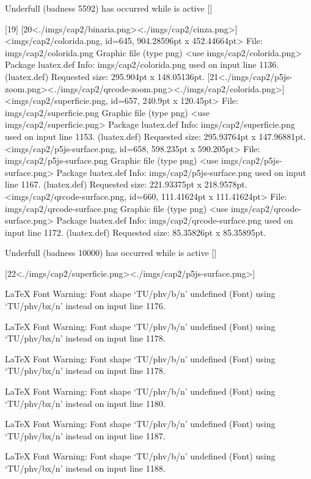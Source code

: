 Underfull \vbox (badness 5592) has occurred while \output is active []

[19] [20<./imgs/cap2/binaria.png><./imgs/cap2/cinza.png>]
<imgs/cap2/colorida.png, id=645, 904.28596pt x 452.44664pt>
File: imgs/cap2/colorida.png Graphic file (type png)
<use imgs/cap2/colorida.png>
Package luatex.def Info: imgs/cap2/colorida.png  used on input line 1136.
(luatex.def)             Requested size: 295.904pt x 148.05136pt.
[21<./imgs/cap2/p5js-zoom.png><./imgs/cap2/qrcode-zoom.png><./imgs/cap2/colorida.png>]
<imgs/cap2/superficie.png, id=657, 240.9pt x 120.45pt>
File: imgs/cap2/superficie.png Graphic file (type png)
<use imgs/cap2/superficie.png>
Package luatex.def Info: imgs/cap2/superficie.png  used on input line 1153.
(luatex.def)             Requested size: 295.93764pt x 147.96881pt.
<imgs/cap2/p5js-surface.png, id=658, 598.235pt x 590.205pt>
File: imgs/cap2/p5js-surface.png Graphic file (type png)
<use imgs/cap2/p5js-surface.png>
Package luatex.def Info: imgs/cap2/p5js-surface.png  used on input line 1167.
(luatex.def)             Requested size: 221.93375pt x 218.9578pt.
<imgs/cap2/qrcode-surface.png, id=660, 111.41624pt x 111.41624pt>
File: imgs/cap2/qrcode-surface.png Graphic file (type png)
<use imgs/cap2/qrcode-surface.png>
Package luatex.def Info: imgs/cap2/qrcode-surface.png  used on input line 1172.
(luatex.def)             Requested size: 85.35826pt x 85.35895pt.

Underfull \vbox (badness 10000) has occurred while \output is active []

[22<./imgs/cap2/superficie.png><./imgs/cap2/p5js-surface.png>]

LaTeX Font Warning: Font shape `TU/phv/b/n' undefined
(Font)              using `TU/phv/bx/n' instead on input line 1176.


LaTeX Font Warning: Font shape `TU/phv/b/n' undefined
(Font)              using `TU/phv/bx/n' instead on input line 1178.


LaTeX Font Warning: Font shape `TU/phv/b/n' undefined
(Font)              using `TU/phv/bx/n' instead on input line 1178.


LaTeX Font Warning: Font shape `TU/phv/b/n' undefined
(Font)              using `TU/phv/bx/n' instead on input line 1180.


LaTeX Font Warning: Font shape `TU/phv/b/n' undefined
(Font)              using `TU/phv/bx/n' instead on input line 1187.


LaTeX Font Warning: Font shape `TU/phv/b/n' undefined
(Font)              using `TU/phv/bx/n' instead on input line 1188.


